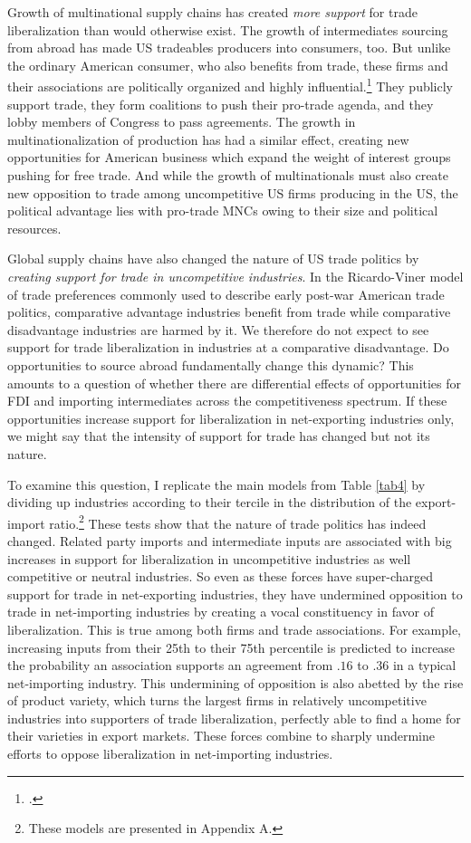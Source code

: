 \documentclass[hidelinks,12pt,letter]{article}
\begin{document}
Growth of multinational supply chains has created \textit{more support} for trade liberalization than would otherwise exist. The growth of intermediates sourcing from abroad has made US tradeables producers into consumers, too. But unlike the ordinary American consumer, who also benefits from trade, these firms and their associations are politically organized and highly influential.\footnote{\citealt{gilens2014testing}.} They publicly support trade, they form coalitions to push their pro-trade agenda, and they lobby members of Congress to pass agreements. The growth in multinationalization of production has had a similar effect, creating new opportunities for American business which expand the weight of interest groups pushing for free trade. And while the growth of multinationals must also create new opposition to trade among uncompetitive US firms producing in the US, the political advantage lies with pro-trade MNCs owing to their size and political resources. 

Global supply chains have also changed the nature of US trade politics by \textit{creating support for trade in uncompetitive industries}. In the Ricardo-Viner model of trade preferences commonly used to describe early post-war American trade politics, comparative advantage industries benefit from trade while comparative disadvantage industries are harmed by it. We therefore do not expect to see support for trade liberalization in industries at a comparative disadvantage. Do opportunities to source abroad fundamentally change this dynamic? This amounts to a question of whether there are differential effects of opportunities for FDI and importing intermediates across the competitiveness spectrum. If these opportunities increase support for liberalization in net-exporting industries only, we might say that the intensity of support for trade has changed but not its nature.  

To examine this question, I replicate the main models from Table \ref{tab4} by dividing up industries according to their tercile in the distribution of the export-import ratio.\footnote{These models are presented in Appendix A.} These tests show that the nature of trade politics has indeed changed. Related party imports and intermediate inputs are associated with big increases in support for liberalization in uncompetitive industries as well competitive or neutral industries. So even as these forces have super-charged support for trade in net-exporting industries, they have undermined opposition to trade in net-importing industries by creating a vocal constituency in favor of liberalization. This is true among both firms and trade associations. For example, increasing inputs from their 25th to their 75th percentile is predicted to increase the probability an association supports an agreement from $.16$ to $.36$ in a typical net-importing industry. This undermining of opposition is also abetted by the rise of product variety, which turns the largest firms in relatively uncompetitive industries into supporters of trade liberalization, perfectly able to find a home for their varieties in export markets. These forces combine to sharply undermine efforts to oppose liberalization in net-importing industries. 
\end{document}
